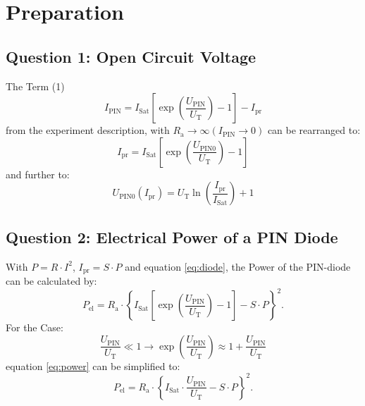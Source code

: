 \chapter{Preparation}

\section{Question 1: Open Circuit Voltage}
The Term (1)
\begin{equation}
 I_{\mathrm{PIN}} = I_{\mathrm{Sat}}\left[\exp\left(\frac{U_{\mathrm{PIN}}}{U_{\mathrm{T}}}\right)-1\right] -I_{\mathrm{pr}}
\label{eq:diode}
\end{equation}
from the experiment description, with $R_{\mathrm{a}}\to\infty(I_{\mathrm{PIN}}\to0)$ can be rearranged to:
\begin{equation}
 I_{\mathrm{pr}} = I_{\mathrm{Sat}}\left[\exp\left(\frac{U_{\mathrm{PIN0}}}{U_{\mathrm{T}}}\right)-1\right]
\end{equation}
and further to:
\begin{equation}
 U_{\mathrm{PIN0}}(I_{\mathrm{pr}}) = U_{\mathrm{T}}\ln\left(\frac{I_{\mathrm{pr}}}{I_{\mathrm{Sat}}}\right)+1
\end{equation}

\section{Question 2: Electrical Power of a PIN Diode}

With $P = R\cdot I^2$, $I_{\mathrm{pr}} = S\cdot P$ and equation \eqref{eq:diode}, the Power of the PIN-diode can be calculated by:
\begin{equation}
 P_{\mathrm{el}} = R_{\mathrm{a}}\cdot\left\{ I_{\mathrm{Sat}}\left[\exp\left(\frac{U_{\mathrm{PIN}}}{U_{\mathrm{T}}}\right)-1\right] -S\cdot P\right\}^2.
\label{eq:power}
\end{equation}
For the Case:
\begin{equation}
 \frac{U_{\mathrm{PIN}}}{U_{\mathrm{T}}} \ll 1 \to \exp\left(\frac{U_{\mathrm{PIN}}}{U_{\mathrm{T}}}\right)\approx1+\frac{U_{\mathrm{PIN}}}{U_{\mathrm{T}}}
\end{equation}
equation \eqref{eq:power} can be simplified to:
\begin{equation}
  P_{\mathrm{el}} = R_{\mathrm{a}}\cdot\left\{ I_{\mathrm{Sat}}\cdot\frac{U_{\mathrm{PIN}}}{U_{\mathrm{T}}} -S\cdot P\right\}^2.
\end{equation}

